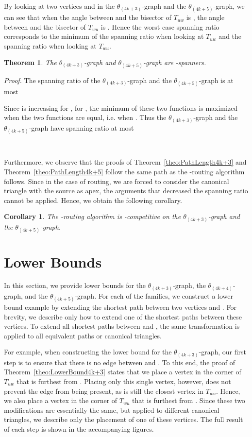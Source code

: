 \documentclass[12pt]{article}
\newtheorem{theo}[defin]{Theorem}
\newenvironment{theorem}{\begin{theo} \sl}{\end{theo}}
\newtheorem{coro}[defin]{Corollary}
\newenvironment{corollary}{\begin{coro} \sl}{\end{coro}}
\newenvironment{proof}{\emph{Proof.}}{\hfill \\}
\newcommand{\graph}[1]{\ensuremath{\theta_{(4 k + #1)}}-graph\xspace}
\newcommand{\canon}[2]{\ensuremath{T_{#1 #2}}}
\begin{document}
By looking at two vertices  and  in the \graph{3} and the \graph{5}, we can see that when the angle between  and the bisector of \canon{u}{w} is , the angle between  and the bisector of \canon{w}{u} is . Hence the worst case spanning ratio corresponds to the minimum of the spanning ratio when looking at \canon{u}{w} and the spanning ratio when looking at \canon{w}{u}. 

\begin{theorem}
  \label{theo:SpanningRatio4k+3,5}
  The \graph{3} and \graph{5} are -spanners. 
\end{theorem}
\begin{proof}
  The spanning ratio of the \graph{3} and the \graph{5} is at most 
  

  Since  is increasing for , for , the minimum of these two functions is maximized when the two functions are equal, i.e. when . Thus the \graph{3} and the \graph{5} have spanning ratio at most 
   
\end{proof}

Furthermore, we observe that the proofs of Theorem~\ref{theo:PathLength4k+3} and Theorem~\ref{theo:PathLength4k+5} follow the same path as the -routing algorithm follows. Since in the case of routing, we are forced to consider the canonical triangle with the source as apex, the arguments that decreased the spanning ratio cannot be applied. Hence, we obtain the following corollary. 

\begin{corollary}
  \label{cor:Routing4k+3,5}
  The -routing algorithm is -competitive on the \graph{3} and the \graph{5}. 
\end{corollary}


\section{Lower Bounds}
\label{sec:LowerBounds}
In this section, we provide lower bounds for the \graph{3}, the \graph{4}, and the \graph{5}. For each of the families, we construct a lower bound example by extending the shortest path between two vertices  and . For brevity, we describe only how to extend one of the shortest paths between these vertices. To extend all shortest paths between  and , the same transformation is applied to all equivalent paths or canonical triangles. 

For example, when constructing the lower bound for the \graph{3}, our first step is to ensure that there is no edge between  and . To this end, the proof of Theorem~\ref{theo:LowerBound4k+3} states that we place a vertex  in the corner of \canon{u}{w} that is furthest from . Placing only this single vertex, however, does not prevent the edge  from being present, as  is still the closest vertex in \canon{w}{u}. Hence, we also place a vertex in the corner of \canon{w}{u} that is furthest from . Since these two modifications are essentially the same, but applied to different canonical triangles, we describe only the placement of one of these vertices. The full result of each step is shown in the accompanying figures. 
\end{document}

